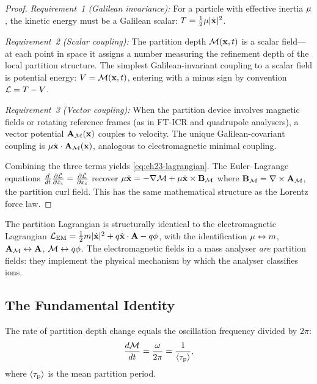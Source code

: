 \begin{proof}
\emph{Requirement~1 (Galilean invariance):} For a particle with effective
inertia $\mu$, the kinetic energy must be a Galilean scalar:
$T = \tfrac{1}{2}\mu|\dot{\mathbf{x}}|^2$.

\emph{Requirement~2 (Scalar coupling):} The partition depth $\mathcal{M}(\mathbf{x}, t)$
is a scalar field---at each point in space it assigns a number measuring the
refinement depth of the local partition structure.  The simplest
Galilean-invariant coupling to a scalar field is potential energy:
$V = \mathcal{M}(\mathbf{x}, t)$, entering with a minus sign by convention
$\mathcal{L} = T - V$.

\emph{Requirement~3 (Vector coupling):} When the partition device involves
magnetic fields or rotating reference frames (as in FT-ICR and quadrupole
analysers), a vector potential $\mathbf{A}_{\mathcal{M}}(\mathbf{x})$ couples to velocity.
The unique Galilean-covariant coupling is
$\mu\dot{\mathbf{x}} \cdot \mathbf{A}_{\mathcal{M}}(\mathbf{x})$, analogous to
electromagnetic minimal coupling.

Combining the three terms yields \eqref{eq:ch23-lagrangian}.  The
Euler--Lagrange equations $\tfrac{d}{dt}\tfrac{\partial\mathcal{L}}{\partial
\dot{x}_i} = \tfrac{\partial\mathcal{L}}{\partial x_i}$ recover
$\mu\ddot{\mathbf{x}} = -\nabla\mathcal{M} +
\mu\dot{\mathbf{x}} \times \mathbf{B}_{\mathcal{M}}$ where
$\mathbf{B}_{\mathcal{M}} = \nabla \times \mathbf{A}_{\mathcal{M}}$, the partition curl field.
This has the same mathematical structure as the Lorentz force law.
\end{proof}

\begin{remark}
The partition Lagrangian is structurally identical to the electromagnetic
Lagrangian $\mathcal{L}_{\mathrm{EM}} = \frac{1}{2}m|\dot{\mathbf{x}}|^2 +
q\dot{\mathbf{x}} \cdot \mathbf{A} - q\phi$, with the identification
$\mu \leftrightarrow m$, $\mathbf{A}_{\mathcal{M}} \leftrightarrow \mathbf{A}$,
$\mathcal{M} \leftrightarrow q\phi$.  The electromagnetic fields in a mass analyser
\emph{are} partition fields: they implement the physical mechanism by which the
analyser classifies ions.
\end{remark}

\subsection{The Fundamental Identity}
\label{sec:ch23-fundamental}

\begin{theorem}
\label{thm:ch23-fundamental}
The rate of partition depth change equals the oscillation frequency divided
by $2\pi$:
\begin{equation}
\label{eq:ch23-fundamental}
  \frac{d\mathcal{M}}{dt} = \frac{\omega}{2\pi} = \frac{1}{\langle\tau_{\mathrm{p}}\rangle},
\end{equation}
where $\langle\tau_{\mathrm{p}}\rangle$ is the mean partition period.
\end{theorem}

